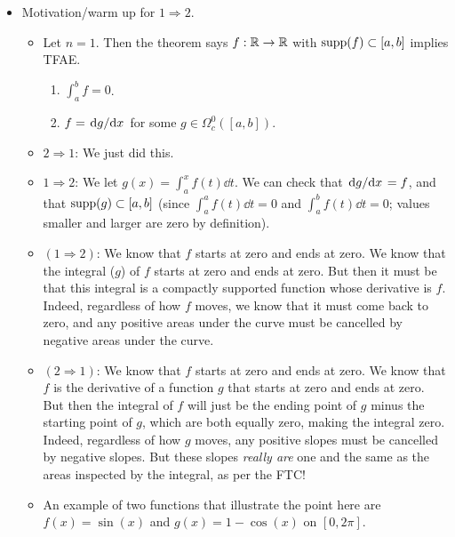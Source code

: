 \documentclass[../notes.tex]{subfiles}
\begin{document}
\begin{itemize}
\begin{proof}[Proof $(2\Rightarrow 1)$]
    \end{proof}
    \begin{proof}[Proof $(1\Rightarrow 2)$]
        If $1\Rightarrow 2$ on some $U\subset\R^n$, then $1\Rightarrow 2$ in $U\times[a_n,b_n]\subset\R^{n+1}$. This inductive step gets us what we need. We'll prove it next time.
    \end{proof}
    \item Motivation/warm up for $1\Rightarrow 2$.
    \begin{itemize}
        \item Let $n=1$. Then the theorem says $f:\mathbb{R}\to\mathbb{R}$ with $\operatorname{supp}(f)\subset[a,b]$ implies TFAE.
        \begin{enumerate}
            \item $\int_a^bf=0$.
            \item $f=\dv*{g}{x}$ for some $g\in\Omega_c^0([a,b])$.
        \end{enumerate}
        \item $2\Rightarrow 1$: We just did this.
        \item $1\Rightarrow 2$: We let $g(x)=\int_a^xf(t)\dd{t}$. We can check that $\dv*{g}{x}=f$, and that $\operatorname{supp}(g)\subset[a,b]$ (since $\int_a^af(t)\dd{t}=0$ and $\int_a^bf(t)\dd{t}=0$; values smaller and larger are zero by definition).
        \item $(1\Rightarrow 2)$: We know that $f$ starts at zero and ends at zero. We know that the integral ($g$) of $f$ starts at zero and ends at zero. But then it must be that this integral is a compactly supported function whose derivative is $f$. Indeed, regardless of how $f$ moves, we know that it must come back to zero, and any positive areas under the curve must be cancelled by negative areas under the curve.
        \item $(2\Rightarrow 1)$: We know that $f$ starts at zero and ends at zero. We know that $f$ is the derivative of a function $g$ that starts at zero and ends at zero. But then the integral of $f$ will just be the ending point of $g$ minus the starting point of $g$, which are both equally zero, making the integral zero. Indeed, regardless of how $g$ moves, any positive slopes must be cancelled by negative slopes. But these slopes \emph{really are} one and the same as the areas inspected by the integral, as per the FTC!
        \item An example of two functions that illustrate the point here are $f(x)=\sin(x)$ and $g(x)=1-\cos(x)$ on $[0,2\pi]$.
        \begin{figure}[h!]

\end{figure}
\end{itemize}
\end{itemize}
\end{document}
